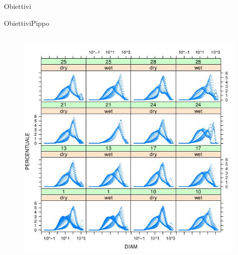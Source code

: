 \documentclass[10pt]{beamer}
\begin{document}
\begin{frame}{Obiettivi}
\begin{frame}{Obiettivi}{Pippo}
\begin{frame}
\begin{columns}
{\begin{figure}
        \includegraphics[width=\textwidth]{../foto/distropisa.jpeg}
      \end{figure}
    }
  \end{columns}  
\end{frame}


\begin{frame}


\end{frame}
\end{frame}
\end{frame}
\end{document}
